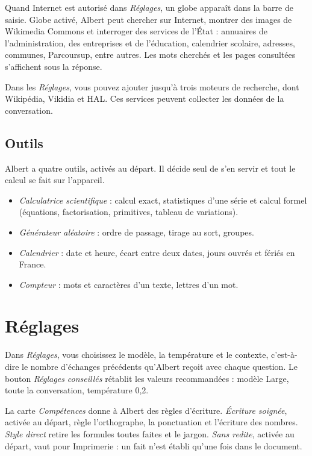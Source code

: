 \documentclass[a4paper, 11pt]{article}
\begin{document}
Quand Internet est autorisé dans \emph{Réglages}, un globe apparaît dans la barre de saisie. Globe activé, Albert peut chercher sur Internet, montrer des images de Wikimedia Commons et interroger des services de l'État : annuaires de l'administration, des entreprises et de l'éducation, calendrier scolaire, adresses, communes, Parcoursup, entre autres. Les mots cherchés et les pages consultées s'affichent sous la réponse.

Dans les \emph{Réglages}, vous pouvez ajouter jusqu'à trois moteurs de recherche, dont Wikipédia, Vikidia et HAL. Ces services peuvent collecter les données de la conversation.

\subsection{Outils}

Albert a quatre outils, activés au départ. Il décide seul de s'en servir et tout le calcul se fait sur l'appareil.
\begin{itemize}
  \item \emph{Calculatrice scientifique} : calcul exact, statistiques d'une série et calcul formel (équations, factorisation, primitives, tableau de variations).
  \item \emph{Générateur aléatoire} : ordre de passage, tirage au sort, groupes.
  \item \emph{Calendrier} : date et heure, écart entre deux dates, jours ouvrés et fériés en France.
  \item \emph{Compteur} : mots et caractères d'un texte, lettres d'un mot.
\end{itemize}

\section{Réglages}
\label{sec:reglages}

Dans \emph{Réglages}, vous choisissez le modèle, la température et le contexte, c'est-à-dire le nombre d'échanges précédents qu'Albert reçoit avec chaque question. Le bouton \emph{Réglages conseillés} rétablit les valeurs recommandées : modèle Large, toute la conversation, température 0,2.

La carte \emph{Compétences} donne à Albert des règles d'écriture. \emph{Écriture soignée}, activée au départ, règle l'orthographe, la ponctuation et l'écriture des nombres. \emph{Style direct} retire les formules toutes faites et le jargon. \emph{Sans redite}, activée au départ, vaut pour Imprimerie : un fait n'est établi qu'une fois dans le document.
\end{document}
